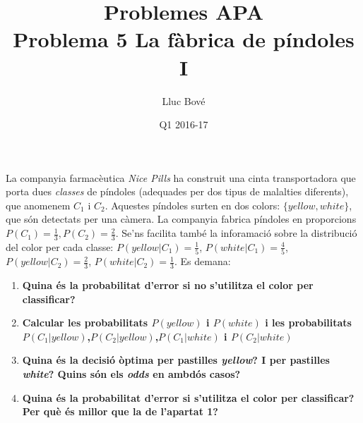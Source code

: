 \documentclass[a4paper]{article}
\title{Problemes APA \\ Problema 5 La fàbrica de píndoles I}
\author{Lluc Bové}
\date{Q1 2016-17}
\begin{document}
\maketitle

La companyia farmacèutica \textit{Nice Pills} ha construit una cinta transportadora que porta dues \textit{classes} de píndoles (adequades per dos tipus de malalties diferents), que anomenem $C_1$ i $C_2$. Aquestes píndoles surten en dos colors: $\{yellow,white\}$, que són detectats per una càmera. La companyia fabrica píndoles en proporcions $P(C_1) = \frac{1}{3}, P(C_2) = \frac{2}{3}$. Se'ns facilita també la inforamació sobre la distribució del color per cada classe: $P(yellow|C_1) = \frac{1}{5}$, $P(white | C_1) = \frac{4}{5}$, $P(yellow| C_2) = \frac{2}{3}$, $P(white|C_2) = \frac{1}{3}$. Es demana:
\begin{enumerate}
	
	\item\textbf{Quina és la probabilitat d'error si no s'utilitza el color per classificar?}\\
		
		
	
	\item\textbf{ Calcular les probabilitats $P(yellow)$ i $P(white)$ i les probabilitats $P(C_1|yellow)$,$P(C_2| yellow)$,$P(C_1 | white)$ i $P(C_2 | white)$} \\
	
	\item\textbf{ Quina és la decisió òptima per pastilles \textit{yellow}? I per pastilles \textit{white}? Quins són els \textit{odds} en ambdós casos?}\\
	
	\item\textbf{Quina és la probabilitat d'error si s'utilitza el color per classificar? Per què és millor que la de l'apartat 1?}

\end{enumerate}
\end{document}
